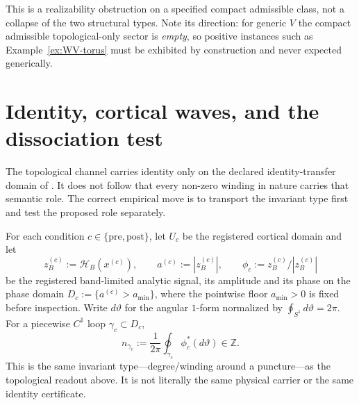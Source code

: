 \documentclass[11pt]{article}
\theoremstyle{definition}
\begin{document}
This is a realizability obstruction on a specified compact admissible
class, not a collapse of the two structural types.  Note its direction:
for generic \(V\) the compact admissible topological-only sector is
\emph{empty}, so
positive instances such as Example~\ref{ex:WV-torus} must be exhibited by
construction and never expected generically.

\section{Identity, cortical waves, and the dissociation test}

The topological channel carries identity only on the declared
identity-transfer domain of \cite{structural}.  It does not follow that
every non-zero winding in nature carries that semantic role.  The
correct empirical move is to transport the invariant type first and test
the proposed role separately.

For each condition \(c\in\{\mathrm{pre},\mathrm{post}\}\), let
\(U_c\) be the registered cortical domain and let
\[
z_B^{(c)}:=\mathcal H_B(x^{(c)}),\qquad
a^{(c)}:=|z_B^{(c)}|,\qquad
\phi_c:=z_B^{(c)}/|z_B^{(c)}|
\]
be the registered band-limited analytic signal, its amplitude and its
phase on the phase domain \(D_c:=\{a^{(c)}>a_{\min}\}\), where the
pointwise floor \(a_{\min}>0\) is fixed before inspection.  Write
\(d\vartheta\) for the angular \(1\)-form normalized by
\(\oint_{S^1}d\vartheta=2\pi\).  For a piecewise \(C^1\) loop
\(\gamma_c\subset D_c\),
\[
n_{\gamma_c}
  :=\frac{1}{2\pi}\oint_{\gamma_c}\phi_c^*(d\vartheta)\in\mathbb Z.
\]
This is the same invariant type---degree/winding around a puncture---as
the topological readout above.  It is not literally the same physical
carrier or the same identity certificate.
\end{document}
